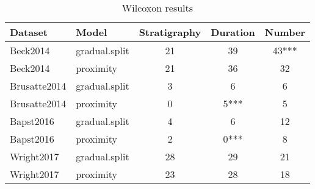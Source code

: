 \begin{table}[!htbp]
\centering
\begin{tabular}{llccc}
  \hline
\textbf{Dataset} & \textbf{Model} & \textbf{Stratigraphy} & \textbf{Duration} & \textbf{Number} \\ 
  \hline
  Beck2014 & gradual.split & 21 & 39 & 43*** \\ 
  Beck2014 & proximity & 21 & 36 & 32 \\ 
  Brusatte2014 & gradual.split & 3 & 6 & 6 \\ 
  Brusatte2014 & proximity & 0 & 5*** & 5 \\ 
  Bapst2016 & gradual.split & 4 & 6 & 12 \\ 
  Bapst2016 & proximity & 2 & 0*** & 8 \\ 
  Wright2017 & gradual.split & 28 & 29 & 21 \\ 
  Wright2017 & proximity & 23 & 28 & 18 \\ 
   \hline
\end{tabular}
\caption{Wilcoxon results} 
\end{table}
